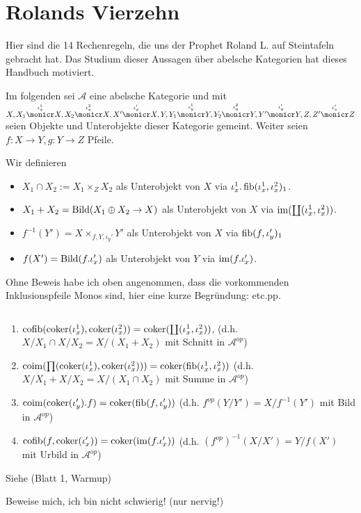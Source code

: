 \section{Rolands Vierzehn}

Hier sind die 14 Rechenregeln, die uns der Prophet Roland L. auf Steintafeln gebracht hat. Das Studium dieser Aussagen über abelsche Kategorien hat dieses Handbuch motiviert.

Im folgenden sei $\mathcal A$ eine abelsche Kategorie und mit $X,
X_1 \overset{\iota_x^1}\monicr X,
X_2 \overset{\iota_x^2}\monicr X,
X'  \overset{\iota_x'}\monicr X,
Y,
Y_1 \overset{\iota_y^1}\monicr Y,
Y_2 \overset{\iota_y^2}\monicr Y,
Y'  \overset{\iota_y'}\monicr Y,
Z,
Z'  \overset{\iota_z'}\monicr Z$
seien Objekte und Unterobjekte dieser Kategorie gemeint.
Weiter seien $f:X\to Y, g:Y\to Z$ Pfeile.

\begin{defn}[Objektnotation]
Wir definieren
\begin{itemize}
\item $X_1 \cap X_2 := X_1\times_Z X_2$ als Unterobjekt von $X$ via $\iota_x^1.\operatorname{fib}(\iota_x^1, \iota_x^2)_1$.
\item $X_1+X_2 = \operatorname{Bild}(X_1 \oplus X_2 \to X)$ als Unterobjekt von $X$ via $\operatorname{im}(\coprod(\iota_x^1,\iota_x^2))$.
\item $f^{-1}(Y') = X \times_{f,Y,\iota_y'} Y'$ als Unterobjekt von $X$ via $\operatorname{fib}(f,\iota_y')_1$
\item $f(X') = \operatorname{Bild}(f.\iota_x')$ als Unterobjekt von $Y$ via $\operatorname{im}(f.\iota_x')$.
\end{itemize}
\end{defn}

\begin{bem}
Ohne Beweis habe ich oben angenommen, dass die vorkommenden Inklusionspfeile Monos sind, hier eine kurze Begründung: etc.pp. %
\end{bem}

\begin{prop}[Dualitätsprinzip] $\quad$ %
\begin{enumerate}
\item $\operatorname{cofib}(\operatorname{coker}(\iota_x^1), \operatorname{coker}(\iota_x^2)) = \operatorname{coker}(\coprod(\iota_x^1,\iota_x^2))$, (d.h. $X/X_1 \cap X/X_2 = X/(X_1+X_2)$ mit Schnitt in $\mathcal A^{op}$)
\item $\operatorname{coim}(\prod(\operatorname{coker}(\iota_x^1),\operatorname{coker}(\iota_x^2))) = \operatorname{coker}(\operatorname{fib}(\iota_x^1,\iota_x^2))$ (d.h. $X/X_1 + X/X_2 = X/(X_1\cap X_2)$ mit Summe in $\mathcal A^{op}$)
\item $\operatorname{coim}(\operatorname{coker}(\iota_y').f) = \operatorname{coker}(\operatorname{fib}(f,\iota_y'))$ (d.h. $f^{op}(Y/Y') = X/f^{-1}(Y')$ mit Bild in $\mathcal A^{op}$)
\item $\operatorname{cofib}(f,\operatorname{coker}(\iota_x')) = \operatorname{coker}(\operatorname{im}(f.\iota_x'))$ (d.h. $(f^{op})^{-1}(X/X') = Y/f(X')$ mit Urbild in $\mathcal A^{op}$)
\end{enumerate}
Siehe (Blatt 1, Warmup)
\end{prop}
\begin{bew}
Beweise mich, ich bin nicht schwierig! (nur nervig!)
\end{bew}

